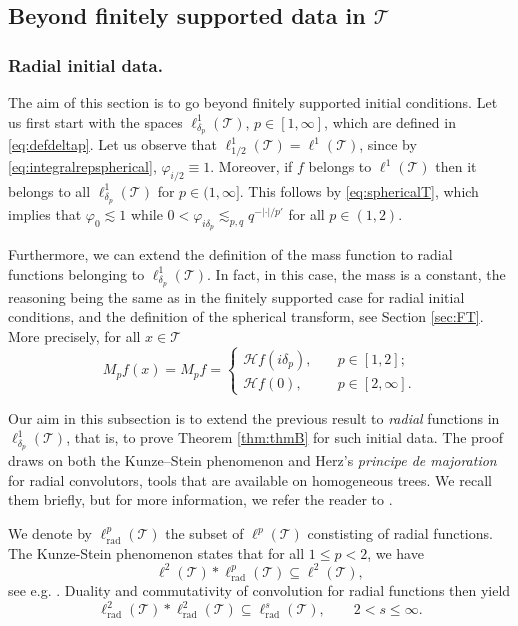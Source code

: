 \documentclass[11pt,a4paper,reqno]{amsart}
\renewcommand\mathcal{\mathscr}
\theoremstyle{plain}
\theoremstyle{remark}
\theoremstyle{definition}
\theoremstyle{remark}
\numberwithin{equation}{section}
\begin{document}
\subsection{Beyond finitely supported data in $\mathcal{T}$}
\subsubsection{Radial initial data.} The aim of this section is to go beyond finitely supported initial conditions. Let us first start with the spaces $\ell^1_{\delta_p}(\mathcal{T})$, $p \in [1, \infty]$, which are defined  in \eqref{eq:defdeltap}.
Let us observe that $\ell^1_{1/2}(\mathcal{T}) = \ell^1(\mathcal{T})$, since by \eqref{eq:integralrepspherical},  $\varphi_{i/2}\equiv 1$. Moreover, if $f$ belongs to $\ell^1(\mathcal{T})$ then it belongs
to all $\ell^1_{\delta_p}(\mathcal{T})$ for $p \in (1, \infty]$. This follows by \eqref{eq:sphericalT}, which implies that $\varphi_0 \lesssim 1$ while $0<\varphi_{i\delta_p}\lesssim_{p,q} q^{-{|\cdot|}/{p'}}$ for all $p\in (1,2)$.


Furthermore, we can extend the definition of the mass function to radial functions belonging to $\ell^1_{\delta_p}(\mathcal{T})$. 
In fact, in this case, the mass is a constant, the reasoning being the same as in the finitely supported case for radial initial conditions, and the definition of the spherical transform, see Section \ref{sec:FT}. More precisely, for all $x\in \mathcal{T}$
\[
M_pf(x)=M_pf=\begin{cases}
    \mathcal{H} f(i\delta_p), \quad &p \in [1, 2];\\
    \mathcal{H} f(0), \quad &p \in [2, \infty].
\end{cases}
\]


Our aim in this subsection is to extend the previous result to \emph{radial} functions in $\ell^1_{\delta_p}(\mathcal{T})$, that is, to prove Theorem \ref{thm:thmB} for such initial data.
The proof draws on both the Kunze--Stein phenomenon and Herz’s \emph{principe de majoration} for radial convolutors, tools that are available on homogeneous trees. We recall them briefly, but for more information, we refer the reader to \cite{CGM, CMS0, CMS, N}.

We denote by $\ell^p_{\text{rad}}(\mathcal{T})$ the subset of $\ell^p(\mathcal{T})$ constisting of radial functions.
The Kunze-Stein phenomenon states that
for all $1 \leq p < 2$, we have
$$\ell^2(\mathcal{T}) \ast \ell^p_{\text{rad}}(\mathcal{T}) \subseteq \ell^2(\mathcal{T}), $$
see e.g. \cite[Theorem 1.4(ii)]{CMS}. Duality and commutativity of convolution for radial functions then yield 
\begin{equation}\label{eq:KS}
\ell^2_{\mathrm{rad}}(\mathcal{T})
\ast
\ell^2_{\mathrm{rad}}(\mathcal{T})
\subseteq
\ell^s_{\mathrm{rad}}(\mathcal{T}),
\qquad 2<s\leq\infty.
\end{equation}
\end{document}
